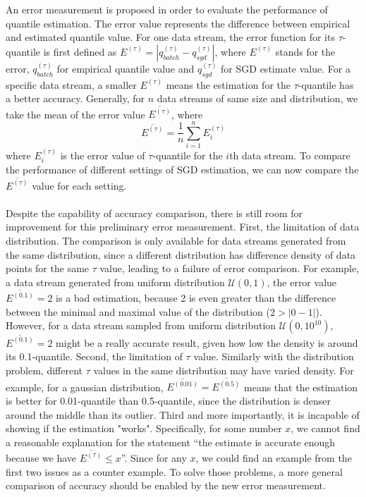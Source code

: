 \documentclass[12pt]{article}
\begin{document}
An error measurement is proposed in order to evaluate the performance of quantile estimation. The error value represents the difference between empirical and estimated quantile value. For one data stream, the error function for its $\tau$-quantile is first defined as $E^{(\tau)} = | q_{batch}^{(\tau)} - q_{sgd}^{(\tau)} |$, where $E^{(\tau)}$ stands for the error, $q_{batch}^{(\tau)}$ for empirical quantile value and $q_{sgd}^{(\tau)}$ for SGD estimate value. For a specific data stream, a smaller $E^{(\tau)}$ means the estimation for the $\tau$-quantile has a better accuracy. Generally, for $n$ data streams of same size and distribution, we take the mean of the error value $\overline{E^{(\tau)}}$, where 
    $$
        \overline{E^{(\tau)}} = \frac{1}{n}\sum_{i=1}^{n} E^{(\tau)}_{i}
    $$
where $E^{(\tau)}_{i}$ is the error value of $\tau$-quantile for the $i$th data stream. To compare the performance of different settings of SGD estimation, we can now compare the $\overline{E^{(\tau)}}$ value for each setting.
\\\\
 Despite the capability of accuracy comparison, there is still room for improvement for this preliminary error measurement. 
 First, the limitation of data distribution. The comparison is only available for data streams generated from the same distribution, since a different distribution has difference density of data points for the same $\tau$ value, leading to a failure of error comparison. For example, a data stream generated from uniform distribution $\mathcal{U}(0,1)$, the error value $\overline{E^{(0.1)}} = 2$ is a bad estimation, because 2 is even greater than the difference between the minimal and maximal value of the distribution ($2 > |0-1|$). However, for a data stream sampled from uniform distribution $\mathcal{U}(0,10^{10})$, $\overline{E^{(0.1)}} = 2$ might be a really accurate result, given how low the density is around its 0.1-quantile. 
 Second, the limitation of $\tau$ value. Similarly with the distribution problem, different $\tau$ values in the same distribution may have varied density. For example, for a gaussian distribution, $\overline{E^{(0.01)}} = \overline{E^{(0.5)}}$ means that the estimation is better for 0.01-quantile than 0.5-quantile, since the distribution is denser around the middle than its outlier.
 Third and more importantly, it is incapable of showing if the estimation "works". Specifically, for some number $x$, we cannot find a reasonable explanation for the statement ``the estimate is accurate enough because we have $\overline{E^{(\tau)}} \leq x$''. Since for any $x$, we could find an example from the first two issues as a counter example. To solve those problems, a more general comparison of accuracy should be enabled by the new error measurement.
\end{document}
